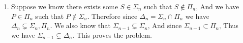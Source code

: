 \begin{enumerate}[label=]
    \item 
        Suppose we know there exists some $S \in \Sigma_n$ such that $S \notin \Pi_n$, And we have $P \in \Pi_n$ such that $P \notin \Sigma_n$. Therefore since $\Delta_n = \Sigma_n \cap \Pi_n$ we have $\Delta_n \subsetneq \Sigma_n , \Pi_n$. We also know that $\Sigma_{n - 1} \subsetneq \Sigma_n$, And since $\Sigma_{n - 1} \subset \Pi_n$, Thus we have $\Sigma_{n - 1} \subsetneq \Delta_n$. This proves the problem.
\end{enumerate}